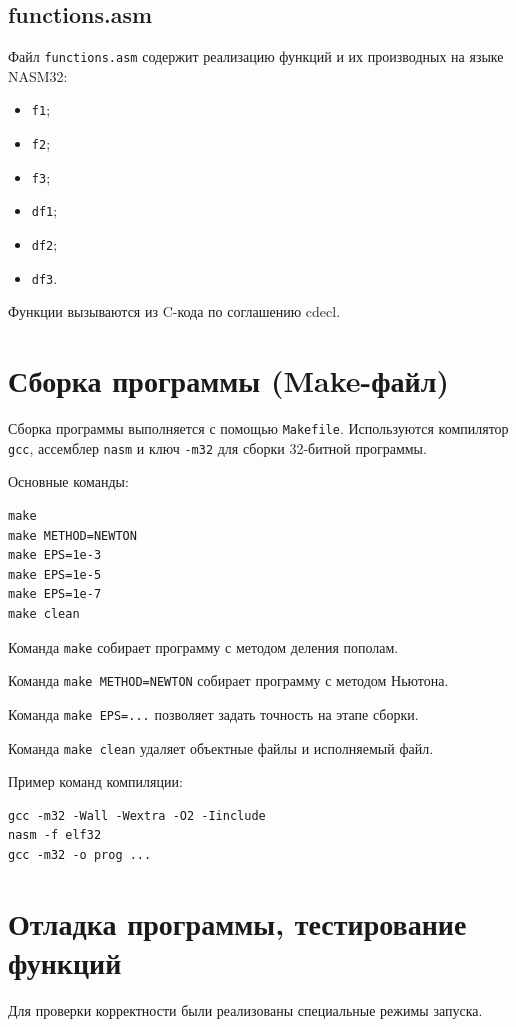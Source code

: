 \documentclass[a4paper,12pt]{article}
\begin{document}
\subsection{functions.asm}
Файл \texttt{functions.asm} содержит реализацию функций и их производных на языке NASM32:
\begin{itemize}
    \item \texttt{f1};
    \item \texttt{f2};
    \item \texttt{f3};
    \item \texttt{df1};
    \item \texttt{df2};
    \item \texttt{df3}.
\end{itemize}

Функции вызываются из C-кода по соглашению cdecl.

\newpage
\section{Сборка программы (Make-файл)}
Сборка программы выполняется с помощью \texttt{Makefile}. Используются компилятор \texttt{gcc}, ассемблер \texttt{nasm} и ключ \texttt{-m32} для сборки 32-битной программы.

Основные команды:
\begin{lstlisting}
make
make METHOD=NEWTON
make EPS=1e-3
make EPS=1e-5
make EPS=1e-7
make clean
\end{lstlisting}

Команда \texttt{make} собирает программу с методом деления пополам.

Команда \texttt{make METHOD=NEWTON} собирает программу с методом Ньютона.

Команда \texttt{make EPS=...} позволяет задать точность на этапе сборки.

Команда \texttt{make clean} удаляет объектные файлы и исполняемый файл.

Пример команд компиляции:
\begin{lstlisting}
gcc -m32 -Wall -Wextra -O2 -Iinclude
nasm -f elf32
gcc -m32 -o prog ...
\end{lstlisting}

\newpage
\section{Отладка программы, тестирование функций}
Для проверки корректности были реализованы специальные режимы запуска.
\end{document}
